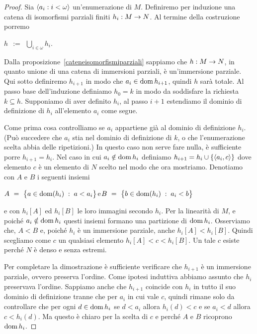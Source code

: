 \begin{proof}
Sia $\langle a_i:i<\omega\rangle$ un'enumerazione di $M$. Definiremo per induzione una catena di isomorfismi parziali finiti $h_i:M\rightarrow N$. Al termine della costruzione porremo

\hfil$\displaystyle h\ \ :=\ \ \bigcup_{i\in\omega} h_i$.

Dalla proposizione~\ref{cateneisomorfismiparziali} sappiamo che $h:M\rightarrow N$, in quanto unione di una catena di immersioni parziali, \`e un'immersione parziale. Qui sotto definiremo $h_{i+1}$ in modo che $a_i\in\mathop{\rm dom} h_{i+1}$, quindi $h$ sar\`a totale. Al passo base dell'induzione definiamo $h_0=k$ in modo da soddisfare la richiesta $k\subseteq h$. Supponiamo di aver definito $h_i$, al passo $i+1$ estendiamo il dominio di definizione di $h_i$ all'elemento $a_i$ come segue.

Come prima cosa controlliamo se $a_i$ appartiene gi\`a al dominio di definizione $h_i$. (Pu\`o succedere che $a_i$ stia nel dominio di definizione di $k$, o che l'enumerazione scelta abbia delle ripetizioni.) In questo caso non serve fare nulla, \`e sufficiente porre $h_{i+1}=h_i$. Nel caso in cui $a_i\notin\mathop{\rm dom} h_i$ definiamo $h_{i+1}=h_i\cup\{\langle a_i,c\rangle\}$ dove elemento $c$ \`e un elemento di $N$ scelto nel modo che ora mostriamo. Denotiamo con $A$ e $B$ i seguenti insiemi

\hfil$A\displaystyle \ =\ \big\{a\in\dom(h_i)\;:\;a<a_i\big\}$\hfil e\hfil $B\ =\ \big\{b\in\dom(h_i)\;:\;a_i<b\big\}$

e con $h_i[A]$ ed $h_i[B]$ le loro immagini secondo $h_i$. Per la linearit\`a di $M$, e poich\'e $a_i\notin\mathop{\rm dom} h_i$ questi insiemi formano una partizione di $\mathop{\rm dom} h_i$. Osserviamo che, $A<B$ e, poich\'e $h_i$ \`e un immersione parziale, anche $h_i[A]<h_i[B]$. Quindi scegliamo come $c$ un qualsiasi elemento $h_i[A]<c<h_i[B]$. Un tale $c$ esiste perch\'e $N$ \`e denso e senza estremi.

Per completare la dimostrazione \`e sufficiente verificare che $h_{i+1}$ \`e un immersione parziale, ovvero preserva l'ordine. Come ipotesi induttiva abbiamo assunto che $h_i$ preservava l'ordine. Sappiamo anche che $h_{i+1}$ coincide con $h_i$ in tutto il suo dominio di definizione tranne che per $a_i$ in cui vale $c$, quindi rimane solo da controllare che per ogni $d\in\mathop{\rm dom} h_i$ se $d<a_i$ allora $h_i(d)<c$ e se $a_i<d$ allora $c<h_i(d)$. Ma questo \`e chiaro per la scelta di $c$ e perch\'e $A$ e $B$ ricoprono $\mathop{\rm dom} h_i$.
\end{proof}

